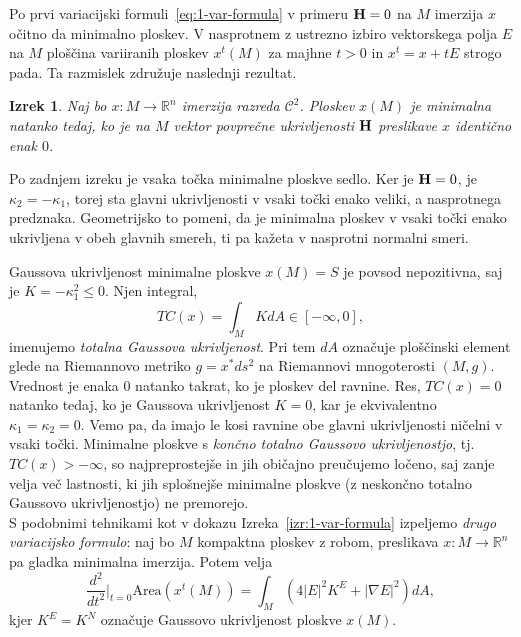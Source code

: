 \documentclass[12pt,a4paper,twoside]{article}
\theoremstyle{definition} %
\theoremstyle{plain} %
\newtheorem{izrek}[definicija]{Izrek}
\numberwithin{equation}{section}  %
\newcommand{\R}{\mathbb R}
\begin{document}
Po prvi variacijski formuli~\eqref{eq:1-var-formula} v primeru $\textbf{\textup{H}} = 0$ na $M$ imerzija $x$ očitno da minimalno ploskev. V nasprotnem z ustrezno izbiro vektorskega polja $E$ na $M$ ploščina variiranih ploskev $x^{t}(M)$ za majhne $t>0$ in $x^{t} = x + tE$ strogo pada. Ta razmislek združuje naslednji rezultat.

\begin{izrek} \label{izr:min-ekviv-H=0}
Naj bo $x \colon M \to \R^{n}$ imerzija razreda $\mathcal{C}^2$. Ploskev $x(M)$ je minimalna natanko tedaj, ko je na $M$ vektor povprečne ukrivljenosti $\textbf{\textup{H}}$ preslikave $x$ identično enak $0$.
\end{izrek}

Po zadnjem izreku je vsaka točka minimalne ploskve sedlo. Ker je $\textup{\textbf{H}} = 0$, je $\kappa_2 = -\kappa_1$, torej sta glavni ukrivljenosti v vsaki točki enako veliki, a nasprotnega predznaka. Geometrijsko to pomeni, da je minimalna ploskev v vsaki točki enako ukrivljena v obeh glavnih smereh, ti pa kažeta v nasprotni normalni smeri.

Gaussova ukrivljenost minimalne ploskve $x(M)=S$ je povsod nepozitivna, saj je $K = -\kappa_{1}^2 \leq 0$.
Njen integral,
\begin{equation} \label{eq:TC-def}
TC(x) = \int_{M} K dA \in [-\infty, 0],
\end{equation} 
imenujemo \emph{totalna Gaussova ukrivljenost}. Pri tem $dA$ označuje ploščinski element glede na Riemannovo metriko $g = x^{*}ds^2$ na Riemannovi mnogoterosti $(M,g)$.
Vrednost je enaka $0$ natanko takrat, ko je ploskev del ravnine. Res, $TC(x) = 0$ natanko tedaj, ko je Gaussova ukrivljenost $K=0$, kar je ekvivalentno $\kappa_1=\kappa_2=0$. Vemo pa, da imajo le kosi ravnine obe glavni ukrivljenosti ničelni v vsaki točki.
Minimalne ploskve s \emph{končno totalno Gaussovo ukrivljenostjo}, tj.~$TC(x) > -\infty$, so najpreprostejše in jih običajno preučujemo ločeno, saj zanje velja več lastnosti, ki jih splošnejše minimalne ploskve (z neskončno totalno Gaussovo ukrivljenostjo) ne premorejo.\\[0.1cm]

S podobnimi tehnikami kot v dokazu Izreka~\ref{izr:1-var-formula} izpeljemo \emph{drugo variacijsko formulo}: naj bo $M$ kompaktna ploskev z robom, preslikava $x \colon M \to \mathbb{R}^{n}$ pa gladka minimalna imerzija. Potem velja
\begin{equation} \label{eq:2-var-formula}
\frac{d^2}{dt^2} \Big|_{t=0} \text{Area} \left(x^{t}(M)\right) = \int_{M} {\left( 4|E|^{2} K^{E} + |\nabla{E}|^2 \right) dA},
\end{equation}
kjer $K^{E} = K^{N}$ označuje Gaussovo ukrivljenost ploskve $x(M)$.
\end{document}
